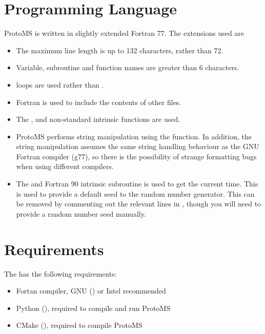 \documentclass[letterpaper,10pt,english]{sphinxmanual}
\begin{document}
\section{Programming Language}
\label{\detokenize{compilation:programming-language}}\label{\detokenize{compilation:fortran77}}
ProtoMS is written in slightly extended Fortran 77. The extensions used are
\begin{itemize}
\item {} 
The maximum line length is up to 132 characters, rather than 72.

\item {} 
Variable, subroutine and function names are greater than 6 characters.

\item {} 
 loops are used rather than .

\item {} 
Fortran  is used to include the contents of other files.

\item {} 
The ,  and  non-standard intrinsic functions are used.

\item {} 
ProtoMS performs string manipulation using the  function. In addition, the string manipulation assumes the same string handling behaviour as the GNU Fortran compiler (g77), so there is the possibility of strange formatting bugs when using different compilers.

\item {} 
The  and  Fortran 90 intrinsic subroutine is used to get the current time. This is used to provide a default seed to the random number generator. This can be removed by commenting out the relevant lines in , though you will need to provide a random number seed manually.

\end{itemize}


\section{Requirements}
\label{\detokenize{compilation:requirements}}
The  has the following requirements:
\begin{itemize}
\item {} 
Fortan compiler, GNU () or Intel recommended

\item {} 
Python (), required to compile and run ProtoMS

\item {} 
CMake (), required to compile ProtoMS

\end{itemize}
\end{document}
